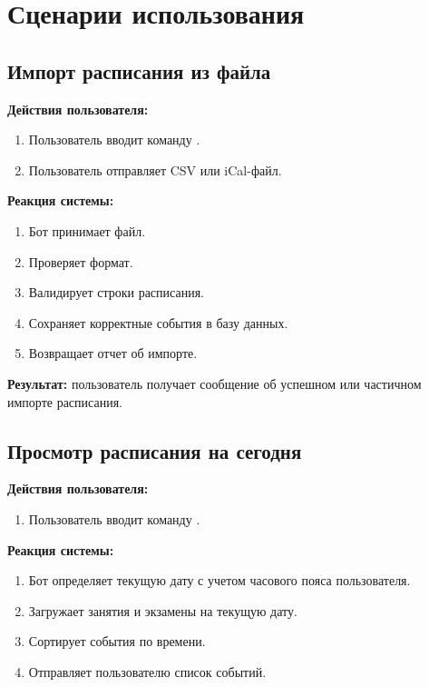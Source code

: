 \documentclass[10pt,a4paper,final]{article} %
\begin{document}
\section{Сценарии использования}

\subsection{Импорт расписания из файла}

\textbf{Действия пользователя:}

\begin{enumerate}
    \item Пользователь вводит команду .
    \item Пользователь отправляет CSV или iCal-файл.
\end{enumerate}

\textbf{Реакция системы:}

\begin{enumerate}
    \item Бот принимает файл.
    \item Проверяет формат.
    \item Валидирует строки расписания.
    \item Сохраняет корректные события в базу данных.
    \item Возвращает отчет об импорте.
\end{enumerate}

\textbf{Результат:} пользователь получает сообщение об успешном или частичном импорте расписания.

\subsection{Просмотр расписания на сегодня}

\textbf{Действия пользователя:}

\begin{enumerate}
    \item Пользователь вводит команду .
\end{enumerate}

\textbf{Реакция системы:}

\begin{enumerate}
    \item Бот определяет текущую дату с учетом часового пояса пользователя.
    \item Загружает занятия и экзамены на текущую дату.
    \item Сортирует события по времени.
    \item Отправляет пользователю список событий.
\end{enumerate}
\end{document}
